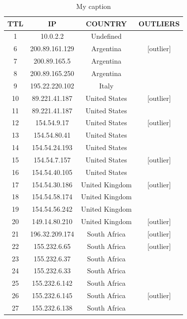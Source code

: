 \begin{table}[!htbp]
\centering
\caption{My caption}
\label{tabla-unisa}
\begin{tabular}{|c|c|c|c|}
\hline
\textbf{TTL} & \textbf{IP}    & \textbf{COUNTRY} & \textbf{OUTLIERS} \\ \hline
1   & 10.0.2.2       & Undefined      &               \\ \hline
6   & 200.89.161.129 & Argentina      & {[}outlier{]} \\ \hline
7   & 200.89.165.5   & Argentina      &               \\ \hline
8   & 200.89.165.250 & Argentina      &               \\ \hline
9   & 195.22.220.102 & Italy          &               \\ \hline
10  & 89.221.41.187  & United States  & {[}outlier{]} \\ \hline
11  & 89.221.41.187  & United States  &               \\ \hline
12  & 154.54.9.17    & United States  & {[}outlier{]} \\ \hline
13  & 154.54.80.41   & United States  &               \\ \hline
14  & 154.54.24.193  & United States  &               \\ \hline
15  & 154.54.7.157   & United States  & {[}outlier{]} \\ \hline
16  & 154.54.40.105  & United States  &               \\ \hline
17  & 154.54.30.186  & United Kingdom & {[}outlier{]} \\ \hline
18  & 154.54.58.174  & United Kingdom &               \\ \hline
19  & 154.54.56.242  & United Kingdom &               \\ \hline
20  & 149.14.80.210  & United Kingdom & {[}outlier{]} \\ \hline
21  & 196.32.209.174 & South Africa   & {[}outlier{]} \\ \hline
22  & 155.232.6.65   & South Africa   & {[}outlier{]} \\ \hline
23  & 155.232.6.37   & South Africa   &               \\ \hline
24  & 155.232.6.33   & South Africa   &               \\ \hline
25  & 155.232.6.142  & South Africa   &               \\ \hline
26  & 155.232.6.145  & South Africa   & {[}outlier{]} \\ \hline
27  & 155.232.6.138  & South Africa   &               \\ \hline
\end{tabular}
\end{table}

